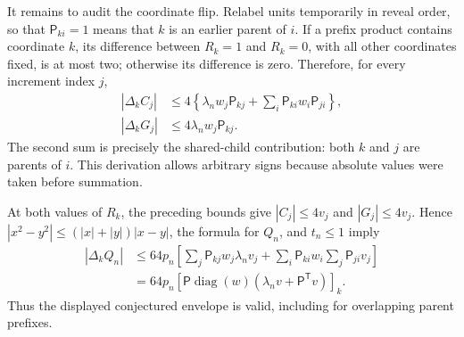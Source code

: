 It remains to audit the coordinate flip.  Relabel units temporarily in reveal order, so that \(\mathsf P_{ki}=1\) means that \(k\) is an earlier parent of \(i\).  If a prefix product contains coordinate \(k\), its difference between \(R_k=1\) and \(R_k=0\), with all other coordinates fixed, is at most two; otherwise its difference is zero.  Therefore, for every increment index \(j\),
\[
 \begin{aligned}
 |\Delta_k C_j|
 &\le4\left\{\lambda_nw_j\mathsf P_{kj}
       +\sum_i\mathsf P_{ki}w_i\mathsf P_{ji}\right\},\\
 |\Delta_k G_j|&\le4\lambda_nw_j\mathsf P_{kj}.
 \end{aligned}
\]
The second sum is precisely the shared-child contribution: both \(k\) and \(j\) are parents of \(i\).  This derivation allows arbitrary signs because absolute values were taken before summation.

At both values of \(R_k\), the preceding bounds give \(|C_j|\le4v_j\) and \(|G_j|\le4v_j\).  Hence \(|x^2-y^2|\le(|x|+|y|)|x-y|\), the formula for \(Q_n\), and \(t_n\le1\) imply
\[
 \begin{aligned}
 |\Delta_kQ_n|
 &\le64p_n\left[\sum_j\mathsf P_{kj}w_j\lambda_nv_j
  +\sum_i\mathsf P_{ki}w_i\sum_j\mathsf P_{ji}v_j\right]\\
 &=64p_n[\mathsf P\operatorname{diag}(w)
       (\lambda_nv+\mathsf P^{\mathsf T}v)]_k.
 \end{aligned}
\]
Thus the displayed conjectured envelope is valid, including for overlapping parent prefixes.

